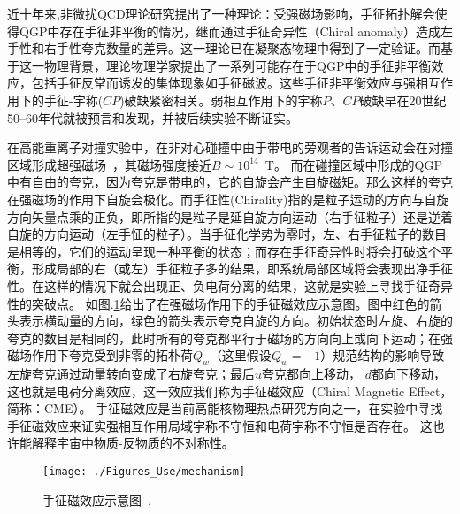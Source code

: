 近十年来,非微扰QCD理论研究提出了一种理论：受强磁场影响，手征拓扑解会使得QGP中存在手征非平衡的情况，继而通过手征奇异性（Chiral anomaly）造成左手性和右手性夸克数量的差异\cite{ChiralAnomality1,Kharzeev_PLB2006,Kharzeev_PLB2008,Review1,Dmitri_NPA2007,Yin_PRL2015,Kharzeev_PRL2010}。这一理论已在凝聚态物理中得到了一定验证。而基于这一物理背景，理论物理学家提出了一系列可能存在于QGP中的手征非平衡效应，包括手征反常而诱发的集体现象如手征磁波。这些手征非平衡效应与强相互作用下的手征-宇称($CP$)破缺紧密相关。弱相互作用下的宇称$P$、$CP$破缺早在20世纪50–60年代就被预言和发现，并被后续实验不断证实。

在高能重离子对撞实验中，在非对心碰撞中由于带电的旁观者的告诉运动会在对撞区域形成超强磁场~\cite{Kharzeev_PLB2006,Dmitri_NPA2007}，其磁场强度接近$B \sim 10^{14}$~T。 而在碰撞区域中形成的QGP中有自由的夸克，因为夸克是带电的，它的自旋会产生自旋磁矩。那么这样的夸克在强磁场的作用下自旋会极化。而手征性(Chirality)指的是粒子运动的方向与自旋方向矢量点乘的正负，即所指的是粒子是延自旋方向运动（右手征粒子）还是逆着自旋的方向运动（左手怔的粒子）。当手征化学势为零时，左、右手征粒子的数目是相等的，它们的运动呈现一种平衡的状态；而存在手征奇异性时将会打破这个平衡，形成局部的右（或左）手征粒子多的结果，即系统局部区域将会表现出净手征性。在这样的情况下就会出现正、负电荷分离的结果，这就是实验上寻找手征奇异性的突破点。
如图.\ref{fig:chargesep}给出了在强磁场作用下的手征磁效应示意图。图中红色的箭头表示横动量的方向，绿色的箭头表示夸克自旋的方向。初始状态时左旋、右旋的夸克的数目是相同的，此时所有的夸克都平行于磁场的方向向上或向下运动；在强磁场作用下夸克受到非零的拓朴荷$Q_w$（这里假设$Q_w = -1$）规范结构的影响导致左旋夸克通过动量转向变成了右旋夸克；最后$u$夸克都向上移动， $d$都向下移动，这也就是电荷分离效应，这一效应我们称为手征磁效应（Chiral Magnetic Effect，简称：CME）。 手征磁效应是当前高能核物理热点研究方向之一，在实验中寻找手征磁效应来证实强相互作用局域宇称不守恒和电荷宇称不守恒是否存在。
这也许能解释宇宙中物质-反物质的不对称性。


\begin{figure}[htb]
\begin{center}
\texttt{[image: ./Figures\_Use/mechanism]}
\end{center}
\caption{手征磁效应示意图~\cite{Kharzeev_PLB2006}.   }
\label{fig:chargesep}
\end{figure}







